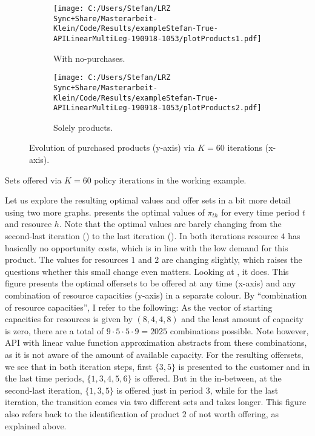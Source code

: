 \begin{figure}[H]
	\begin{subfigure}[t]{.5\textwidth}
		\centering	
		\texttt{[image: C:/Users/Stefan/LRZ Sync+Share/Masterarbeit-Klein/Code/Results/exampleStefan-True-APILinearMultiLeg-190918-1053/plotProducts1.pdf]}
		\caption{\label{fig-adp-products1} With no-purchases.}
	\end{subfigure}%
	\begin{subfigure}[t]{.5\textwidth}
		\centering
		\texttt{[image: C:/Users/Stefan/LRZ Sync+Share/Masterarbeit-Klein/Code/Results/exampleStefan-True-APILinearMultiLeg-190918-1053/plotProducts2.pdf]}
		\caption{\label{fig-adp-products2} Solely products.}
	\end{subfigure}
	\caption[Evolution of purchased products via $K=60$ policy iterations.]{\label{fig-adp-products}Evolution of purchased products (y-axis) via $K=60$ iterations (x-axis).}
\end{figure}

\begin{table}
	\footnotesize
	\resizebox{\linewidth}{!}{
	
	}
	\caption{\label{tb-adp-offersets}Sets offered via $K=60$ policy iterations in the working example.}
\end{table}

Let us explore the resulting optimal values and offer sets in a bit more detail using two more graphs.  presents the optimal values of $\pi_{th}$ for every time period $t$ and resource $h$. Note that the optimal values are barely changing from the second-last iteration () to the last iteration (). In both iterations resource $4$ has basically no opportunity costs, which is in line with the low demand for this product. The values for resources $1$ and $2$ are changing slightly, which raises the questions whether this small change even matters. Looking at , it does. This figure presents the optimal offersets to be offered at any time (x-axis) and any combination of resource capacities (y-axis) in a separate colour. By \enquote{combination of resource capacities}, I refer to the following: As the vector of starting capacities for resources is given by $(8, 4, 4, 8)$ and the least amount of capacity is zero, there are a total of $9 \cdot 5\cdot 5 \cdot 9 = 2025$ combinations possible. Note however, API with linear value function approximation abstracts from these combinations, as it is not aware of the amount of available capacity. For the resulting offersets, we see that in both iteration steps, first $\{3, 5\}$ is presented to the customer and in the last time periods, $\{1, 3,4,5,6\}$ is offered. But in the in-between, at the second-last iteration, $\{1,3,5\}$ is offered just in period $3$, while for the last iteration, the transition comes via two different sets and takes longer. This figure also refers back to the identification of product $2$ of not worth offering, as explained above.


